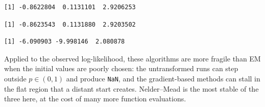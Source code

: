 \documentclass[
  letterpaper,
  DIV=11,
  numbers=noendperiod]{scrreprt}
\newenvironment{Shaded}{\begin{snugshade}}{\end{snugshade}}
\newcommand{\AttributeTok}[1]{\textcolor[rgb]{0.40,0.45,0.13}{#1}}
\newcommand{\DecValTok}[1]{\textcolor[rgb]{0.68,0.00,0.00}{#1}}
\newcommand{\DocumentationTok}[1]{\textcolor[rgb]{0.37,0.37,0.37}{\textit{#1}}}
\newcommand{\FunctionTok}[1]{\textcolor[rgb]{0.28,0.35,0.67}{#1}}
\newcommand{\NormalTok}[1]{\textcolor[rgb]{0.00,0.23,0.31}{#1}}
\newcommand{\SpecialCharTok}[1]{\textcolor[rgb]{0.37,0.37,0.37}{#1}}
\newcommand{\StringTok}[1]{\textcolor[rgb]{0.13,0.47,0.30}{#1}}
\begin{document}
\begin{verbatim}
[1] -0.8622804  0.1131101  2.9206253
\end{verbatim}

\begin{Shaded}
\end{Shaded}

\begin{verbatim}
[1] -0.8623543  0.1131880  2.9203502
\end{verbatim}

\begin{Shaded}
\end{Shaded}

\begin{verbatim}
[1] -6.090903 -9.998146  2.080878
\end{verbatim}

Applied to the observed log-likelihood, these algorithms are more
fragile than EM when the initial values are poorly chosen: the
untransformed runs can step outside \(p \in (0,1)\) and produce
\texttt{NaN}, and the gradient-based methods can stall in the flat
region that a distant start creates. Nelder--Mead is the most stable of
the three here, at the cost of many more function evaluations.
\end{document}
